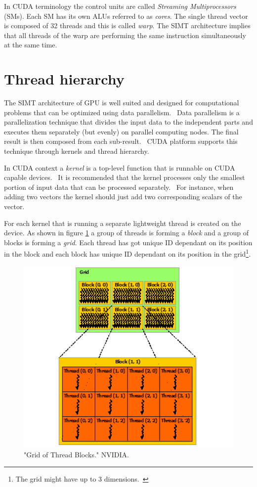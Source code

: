 \documentclass[12pt,oneside]{fithesis2}
\begin{document}
In CUDA terminology the control units are called \emph{Streaming Multiprocessors} (SMs). Each SM has its own ALUs referred to as \emph{cores}. The single thread vector is composed of 32 threads and this is called \emph{warp}. The SIMT architecture implies that all threads of the warp are performing the same instruction simultaneously at the same time.~\cite{cuda_guide}


\section{Thread hierarchy}
\label{thread_hierarchy}

The SIMT architecture of GPU is well suited and designed for computational problems that can be optimized using data parallelism.~\cite{professional_cuda} Data parallelism is a parallelization technique that divides the input data to the independent parts and executes them separately (but evenly) on parallel computing nodes. The final result is then composed from each sub-result.~\cite{data_parallel_algorithms} CUDA platform supports this technique through kernels and thread hierarchy.

In CUDA context a \emph{kernel} is a top-level function that is runnable on CUDA capable devices.~\cite{cuda_guide} It is recommended that the kernel processes only the smallest portion of input data that can be processed separately.~\cite{data_parallel_algorithms} For instance, when adding two vectors the kernel should just add two corresponding scalars of the vector.

For each kernel that is running a separate lightweight thread is created on the device. As shown in figure \ref{fig:grid} a group of threads is forming a \emph{block} and a group of blocks is forming a \emph{grid}. Each thread has got unique ID dependant on its position in the block and each block has unique ID dependant on its position in the grid\footnote{The grid might have up to 3 dimensions.~\cite{cuda_guide}}.

\begin{figure}[H]
	\centering
	\includegraphics[scale=0.9]{figures/grid-of-thread-blocks.png}
	\caption{"Grid of Thread Blocks." NVIDIA. \cite{cuda_guide}}
	\label{fig:grid}
\end{figure}
\end{document}
